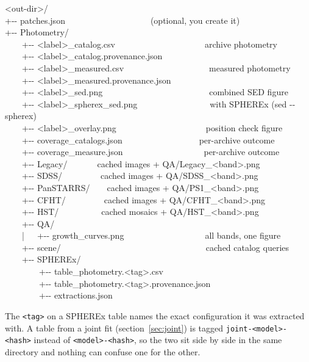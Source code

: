 \documentclass[11pt]{article}
\begin{document}
\begin{cmd}\ttfamily\frenchspacing
<out-dir>/\\
+-{}- patches.json~~~~~~~~~~~~~~~~~~~~(optional, you create it)\\
+-{}- Photometry/\\
\mbox{}~~~~+-{}- <label>\_catalog.csv~~~~~~~~~~~~~~~~~~~~~archive photometry\\
\mbox{}~~~~+-{}- <label>\_catalog.provenance.json\\
\mbox{}~~~~+-{}- <label>\_measured.csv~~~~~~~~~~~~~~~~~~~~measured photometry\\
\mbox{}~~~~+-{}- <label>\_measured.provenance.json\\
\mbox{}~~~~+-{}- <label>\_sed.png~~~~~~~~~~~~~~~~~~~~~~~~~combined SED figure\\
\mbox{}~~~~+-{}- <label>\_spherex\_sed.png~~~~~~~~~~~~~~~~~with SPHEREx (sed -{}-spherex)\\
\mbox{}~~~~+-{}- <label>\_overlay.png~~~~~~~~~~~~~~~~~~~~~position check figure\\
\mbox{}~~~~+-{}- coverage\_catalogs.json~~~~~~~~~~~~~~~~~~per-archive outcome\\
\mbox{}~~~~+-{}- coverage\_measure.json~~~~~~~~~~~~~~~~~~~per-archive outcome\\
\mbox{}~~~~+-{}- Legacy/~~~~~~~cached images + QA/Legacy\_<band>.png\\
\mbox{}~~~~+-{}- SDSS/~~~~~~~~~cached images + QA/SDSS\_<band>.png\\
\mbox{}~~~~+-{}- PanSTARRS/~~~~cached images + QA/PS1\_<band>.png\\
\mbox{}~~~~+-{}- CFHT/~~~~~~~~~cached images + QA/CFHT\_<band>.png\\
\mbox{}~~~~+-{}- HST/~~~~~~~~~~cached mosaics + QA/HST\_<band>.png\\
\mbox{}~~~~+-{}- QA/\\
\mbox{}~~~~|~~~+-{}- growth\_curves.png~~~~~~~~~~~~~~~~~~~all bands, one figure\\
\mbox{}~~~~+-{}- scene/~~~~~~~~~~~~~~~~~~~~~~~~~~~~~~~~~~cached catalog queries\\
\mbox{}~~~~+-{}- SPHEREx/\\
\mbox{}~~~~~~~~+-{}- table\_photometry.<tag>.csv\\
\mbox{}~~~~~~~~+-{}- table\_photometry.<tag>.provenance.json\\
\mbox{}~~~~~~~~+-{}- extractions.json
\end{cmd}

The \texttt{<tag>} on a SPHEREx table names the exact configuration it was
extracted with. A table from a joint fit
(section~\ref{sec:joint}) is tagged \texttt{joint-<model>-<hash>} instead of
\texttt{<model>-<hash>}, so the two sit side by side in the same directory
and nothing can confuse one for the other.
\end{document}
